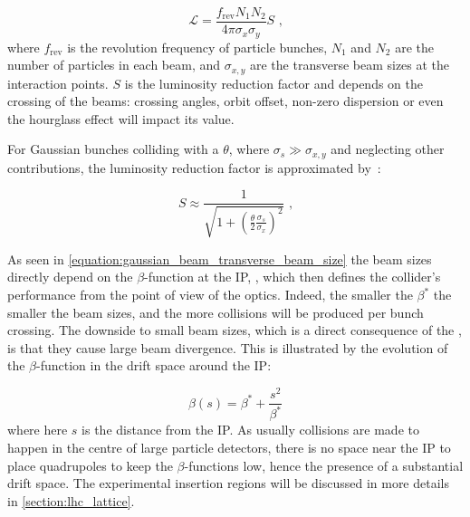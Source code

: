 \begin{equation}
    \mathcal{L} = \frac{f_{\mathrm{rev}} N_1 N_2}{4 \pi \sigma_x \sigma_y} S \text{ ,}
    \label{equation:luminosity_gaussian_beams}
\end{equation}
where \(f_{\mathrm{rev}}\) is the revolution frequency of particle bunches, \(N_1\) and \(N_2\) are the number of particles in each beam, and \(\sigma_{x,y}\) are the transverse beam sizes at the interaction points.
\(S\) is the luminosity reduction factor and depends on the crossing of the beams: crossing angles, orbit offset, non-zero dispersion or even the hourglass effect will impact its value.

For Gaussian bunches colliding with a  \(\theta\), where \(\sigma_s \gg \sigma_{x,y}\) and neglecting other contributions, the luminosity reduction factor is approximated by~\cite{CERN:Herr:Concept_Luminosity}:

\begin{equation}
    S \approx \frac{1}{\sqrt{1 + \left( \frac{\theta}{2} \frac{\sigma_s}{\sigma_x} \right)^2}} \text{ ,}
    \label{equation:luminosity_reduction_factor}
\end{equation}

As seen in \cref{equation:gaussian_beam_transverse_beam_size} the beam sizes directly depend on the \(\beta\)-function at the IP, \betastar, which then defines the collider's performance from the point of view of the optics.
Indeed, the smaller the \(\beta^{\ast}\) the smaller the beam sizes, and the more collisions will be produced per bunch crossing. 
The downside to small beam sizes, which is a direct consequence of the , is that they cause large beam divergence.
This is illustrated by the evolution of the \(\beta\)-function in the drift space around the IP:

\begin{equation}
    \beta(s) = \beta^{\ast} + \frac{s^2}{\beta^{\ast}}
    \label{equation:betafunction_drift_space}
\end{equation}
where here \(s\) is the distance from the IP.
As usually collisions are made to happen in the centre of large particle detectors, there is no space near the IP to place quadrupoles to keep the \(\beta\)-functions low, hence the presence of a substantial drift space.
The experimental insertion regions will be discussed in more details in \cref{section:lhc_lattice}.


